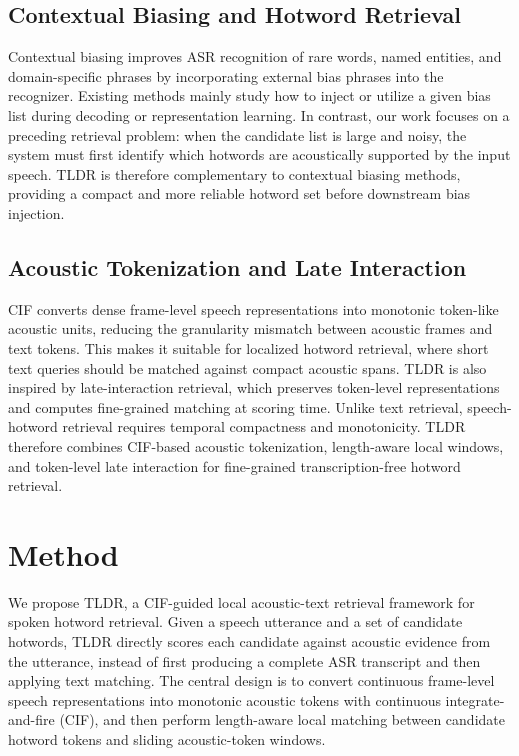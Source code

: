 \documentclass[letterpaper]{article} %
\begin{document}
\subsection{Contextual Biasing and Hotword Retrieval}
Contextual biasing improves ASR recognition of rare words, named entities, and domain-specific phrases by incorporating external bias phrases into the recognizer. Existing methods mainly study how to inject or utilize a given bias list during decoding or representation learning. In contrast, our work focuses on a preceding retrieval problem: when the candidate list is large and noisy, the system must first identify which hotwords are acoustically supported by the input speech. TLDR is therefore complementary to contextual biasing methods, providing a compact and more reliable hotword set before downstream bias injection.

\subsection{Acoustic Tokenization and Late Interaction}
CIF converts dense frame-level speech representations into monotonic token-like acoustic units, reducing the granularity mismatch between acoustic frames and text tokens. This makes it suitable for localized hotword retrieval, where short text queries should be matched against compact acoustic spans. TLDR is also inspired by late-interaction retrieval, which preserves token-level representations and computes fine-grained matching at scoring time. Unlike text retrieval, speech-hotword retrieval requires temporal compactness and monotonicity. TLDR therefore combines CIF-based acoustic tokenization, length-aware local windows, and token-level late interaction for fine-grained transcription-free hotword retrieval.


\section{Method}

We propose TLDR, a CIF-guided local acoustic-text retrieval framework for spoken hotword retrieval. Given a speech utterance and a set of candidate hotwords, TLDR directly scores each candidate against acoustic evidence from the utterance, instead of first producing a complete ASR transcript and then applying text matching. The central design is to convert continuous frame-level speech representations into monotonic acoustic tokens with continuous integrate-and-fire (CIF), and then perform length-aware local matching between candidate hotword tokens and sliding acoustic-token windows.
\end{document}
